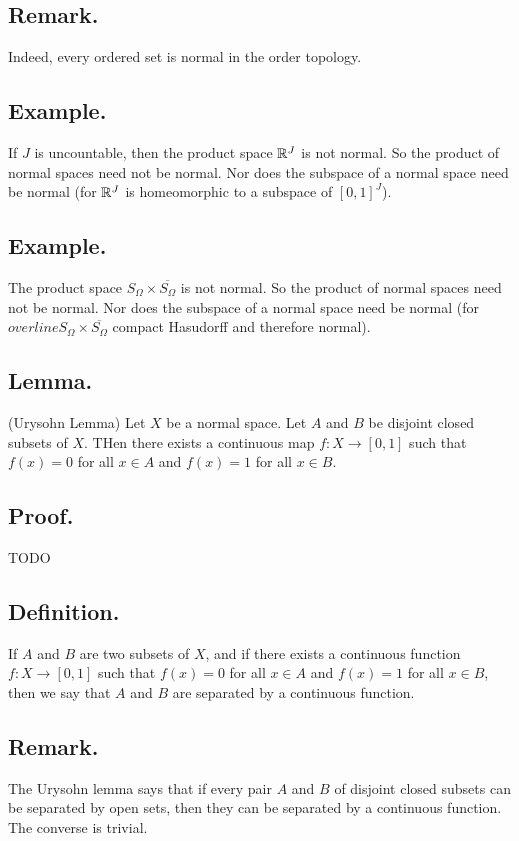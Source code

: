 \documentclass[titlepage]{article}
\begin{document}
\subsection{Remark.} Indeed, every ordered set is normal in the order topology.

\subsection{Example.} If $J$ is uncountable, then the product space $\mathbb{R}^{J}$ is not normal. So the product of normal spaces need not be normal. Nor does the subspace of a normal space need be normal (for $\mathbb{R}^{J}$ is homeomorphic to a subspace of $[0, 1]^{J}$).

\subsection{Example.} The product space $S_{\Omega} \times \overline{S_{\Omega}}$ is not normal. So the product of normal spaces need not be normal. Nor does the subspace of a normal space need be normal (for $overline{S_{\Omega}} \times \overline{S_{\Omega}}$ compact Hasudorff and therefore normal).

\subsection{Lemma.} (Urysohn Lemma) Let $X$ be a normal space. Let $A$ and $B$ be disjoint closed subsets of $X$. THen there exists a continuous map $f: X \to [0, 1]$ such that $f(x) = 0$ for all $x \in A$ and $f(x) = 1$ for all $x \in B$.

\subsection{Proof.} TODO

\subsection{Definition.} If $A$ and $B$ are two subsets of $X$, and if there exists a continuous function $f: X \to [0, 1]$ such that $f(x) = 0$ for all $x \in A$ and $f(x) = 1$ for all $x \in B$, then we say that $A$ and $B$ are separated by a continuous function.

\subsection{Remark.} The Urysohn lemma says that if every pair $A$ and $B$ of disjoint closed subsets can be separated by open sets, then they can be separated by a continuous function. The converse is trivial.
\end{document}
